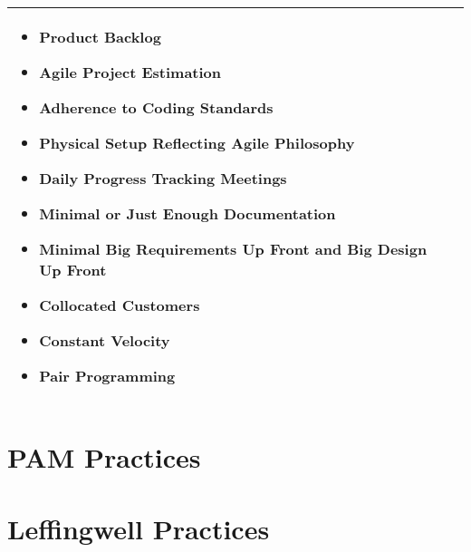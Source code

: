 \begin{tabular}{| p{7.5cm}  p{7.5cm} |}
\begin{itemize}
     		\item Product Backlog 
     		\item Agile Project Estimation 
     		\item Adherence to Coding Standards 
     		\item Physical Setup Reflecting Agile Philosophy 
     		\item Daily Progress Tracking Meetings 
     		\item Minimal or Just Enough Documentation 
     		\item Minimal Big Requirements Up Front and Big Design Up Front 
     		\item Collocated Customers 
     		\item Constant Velocity 
     		\item Pair Programming  
 		\end{itemize} 
     \\ \hline
\end{tabular}
\label{table:opp_practices}

\section{PAM Practices}
\section{Leffingwell Practices}


